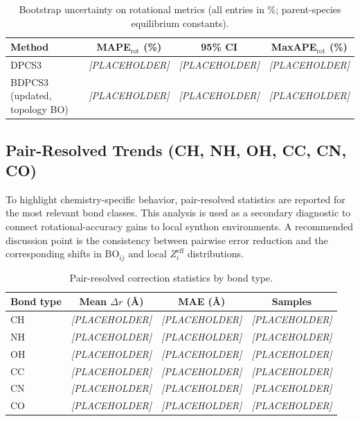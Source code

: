 \documentclass[journal=jctcce,manuscript=article]{achemso}
\begin{document}
\begin{table}[ht]
\caption{Bootstrap uncertainty on rotational metrics (all entries in \%; parent-species equilibrium constants).}
\label{tab:bootstrap_ci}
\centering
\begin{tabular}{lccc}
\toprule
Method & MAPE$_\mathrm{rot}$ (\%) & 95\% CI & MaxAPE$_\mathrm{rot}$ (\%) \\
\midrule
DPCS3 & \textit{[PLACEHOLDER]} & \textit{[PLACEHOLDER]} & \textit{[PLACEHOLDER]} \\
BDPCS3 (updated, topology BO) & \textit{[PLACEHOLDER]} & \textit{[PLACEHOLDER]} & \textit{[PLACEHOLDER]} \\
\bottomrule
\end{tabular}
\end{table}

\subsection{Pair-Resolved Trends (CH, NH, OH, CC, CN, CO)}
To highlight chemistry-specific behavior, pair-resolved statistics are reported for the most relevant bond classes. This analysis is used as a secondary diagnostic to connect rotational-accuracy gains to local synthon environments.
A recommended discussion point is the consistency between pairwise error reduction and the corresponding shifts in $\mathrm{BO}_{ij}$ and local $Z_i^{\mathrm{eff}}$ distributions.

\begin{table}[ht]
\caption{Pair-resolved correction statistics by bond type.}
\label{tab:pair_resolved}
\centering
\begin{tabular}{lccc}
\toprule
Bond type & Mean $\Delta r$ (\AA) & MAE (\AA) & Samples \\
\midrule
CH & \textit{[PLACEHOLDER]} & \textit{[PLACEHOLDER]} & \textit{[PLACEHOLDER]} \\
NH & \textit{[PLACEHOLDER]} & \textit{[PLACEHOLDER]} & \textit{[PLACEHOLDER]} \\
OH & \textit{[PLACEHOLDER]} & \textit{[PLACEHOLDER]} & \textit{[PLACEHOLDER]} \\
CC & \textit{[PLACEHOLDER]} & \textit{[PLACEHOLDER]} & \textit{[PLACEHOLDER]} \\
CN & \textit{[PLACEHOLDER]} & \textit{[PLACEHOLDER]} & \textit{[PLACEHOLDER]} \\
CO & \textit{[PLACEHOLDER]} & \textit{[PLACEHOLDER]} & \textit{[PLACEHOLDER]} \\
\bottomrule
\end{tabular}
\end{table}
\end{document}
